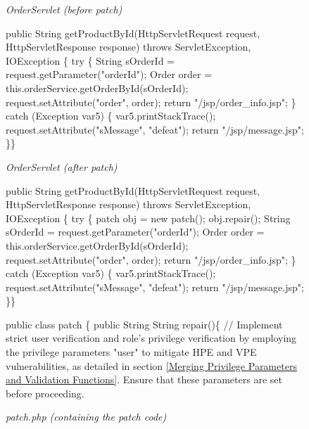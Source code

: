 \documentclass[10pt,journal,compsoc]{IEEEtran}
\begin{document}
\begin{CJK}{UTF8}{gbsn}
\begin{figure*}[h]
\begin{minipage}[t]{0.48\textwidth}
\begin{algorithm}[H]
\small
\renewcommand{\thealgorithm}{}
\caption{\textit{OrderServlet (before patch)}}
\begin{algorithmic}[1]
\State public String getProductById(HttpServletRequest request, HttpServletResponse response) throws ServletException, IOException \{
\State try \{
\State String sOrderId = request.getParameter("orderId");
\State Order order = this.orderService.getOrderById(sOrderId);
\State request.setAttribute("order", order);
\State     return "/jsp/order\_info.jsp";
\State \} catch (Exception var5) \{
\State var5.printStackTrace();
\State request.setAttribute("sMessage", "defeat");
\State return "/jsp/message.jsp";
\State \}\}
\end{algorithmic}
\end{algorithm}
\end{minipage}
\hfill
\begin{minipage}[t]{0.48\textwidth}
\begin{algorithm}[H]
\small
\renewcommand{\thealgorithm}{}
\caption{\textit{OrderServlet (after patch)}}
\begin{algorithmic}[1]
\State public String getProductById(HttpServletRequest request, HttpServletResponse response) throws ServletException, IOException \{
\State try \{
\State \textcolor[rgb]{0.16,0.32,0.66}{patch obj = new patch();}
\State \textcolor[rgb]{0.16,0.32,0.66}{obj.repair();}
\State String sOrderId = request.getParameter("orderId");
\State Order order = this.orderService.getOrderById(sOrderId);
\State request.setAttribute("order", order);
\State     return "/jsp/order\_info.jsp";
\State \} catch (Exception var5) \{
\State var5.printStackTrace();
\State request.setAttribute("sMessage", "defeat");
\State return "/jsp/message.jsp";
\State \}\}
\end{algorithmic}
\end{algorithm}
\end{minipage}
\hfill
\begin{minipage}[t]{1\textwidth}
\begin{algorithm}[H]
\small
\renewcommand{\thealgorithm}{}
\caption{\textit{patch.php (containing the patch code)}}
\begin{algorithmic}[1]
\State public class patch \{
\State public String String repair()\{
\Statex \textcolor[rgb]{0.16,0.32,0.66}{// Implement strict user verification and role's privilege verification by employing the privilege parameters "user" to mitigate HPE and VPE vulnerabilities, as detailed in section \ref{Merging Privilege Parameters and Validation Functions}. Ensure that these parameters are set before proceeding.}

\end{algorithmic}
\end{algorithm}
\end{minipage}
\end{figure*}
\end{CJK}
\end{document}
